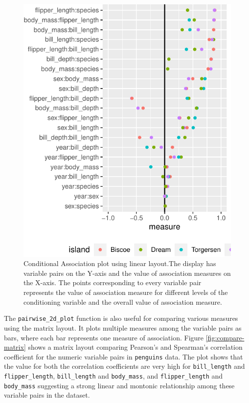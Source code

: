 \begin{Schunk}
\begin{figure}

{\centering \includegraphics{rj_paper_files/figure-latex/linear-cond-assoc-1} 

}

\caption[Conditional Association plot using linear layout.The display has variable pairs on the Y-axis and the value of association measures on the X-axis]{Conditional Association plot using linear layout.The display has variable pairs on the Y-axis and the value of association measures on the X-axis. The points corresponding to every variable pair represents the value of association measure for different levels of the conditioning variable and the overall value of association measure.}\label{fig:linear-cond-assoc}
\end{figure}
\end{Schunk}

The \texttt{pairwise\_2d\_plot} function is also useful for comparing
various measures using the matrix layout. It plots multiple measures
among the variable pairs as bars, where each bar represents one measure
of association. Figure \ref{fig:compare-matrix} shows a matrix layout
comparing Pearson's and Spearman's correlation coefficient for the
numeric variable pairs in \texttt{penguins} data. The plot shows that
the value for both the correlation coefficients are very high for
\texttt{bill\_length} and \texttt{flipper\_length},
\texttt{bill\_length} and \texttt{body\_mass}, and
\texttt{flipper\_length} and \texttt{body\_mass} suggesting a strong
linear and montonic relationship among these variable pairs in the
dataset.

